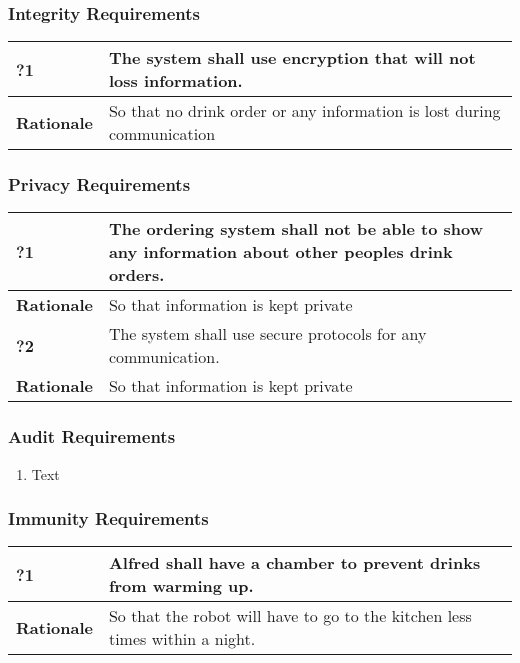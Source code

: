 \documentclass [11pt]{article}
\begin{document}
\subsubsection{Integrity Requirements }

\begin{longtable}{| p{ } | p{ } | }\hline 
	\rowcolor{tableCell}\textbf{?1} & The system shall use encryption that will not loss information. \\ \hline
	\textbf{Rationale} &  So that no drink order or any information is lost during communication\\ \hline 
\end{longtable}
\subsubsection{Privacy Requirements }

\begin{longtable}{| p{ } | p{ } | }\hline 
	\rowcolor{tableCell}\textbf{?1} & The ordering system shall not be able to show any information about other peoples drink orders. \\ \hline
	\textbf{Rationale} &  So that information is kept private\\ \hline 
	\rowcolor{tableCell}\textbf{?2} & The system shall use secure protocols for any communication. \\ \hline
	\textbf{Rationale} &  So that information is kept private\\ \hline 
\end{longtable}
\subsubsection{Audit  Requirements }
	\begin{enumerate}[label=\textbf{(\roman*)}]
		\item Text
	\end{enumerate} 

\subsubsection{Immunity Requirements  }

\begin{longtable}{| p{ } | p{ } | }\hline 
	\rowcolor{tableCell}\textbf{?1} & Alfred shall have a chamber to prevent drinks from warming up. \\ \hline
	\textbf{Rationale} & So that the robot will have to go to the kitchen less times within a night.\\ \hline 
\end{longtable}
\end{document}
